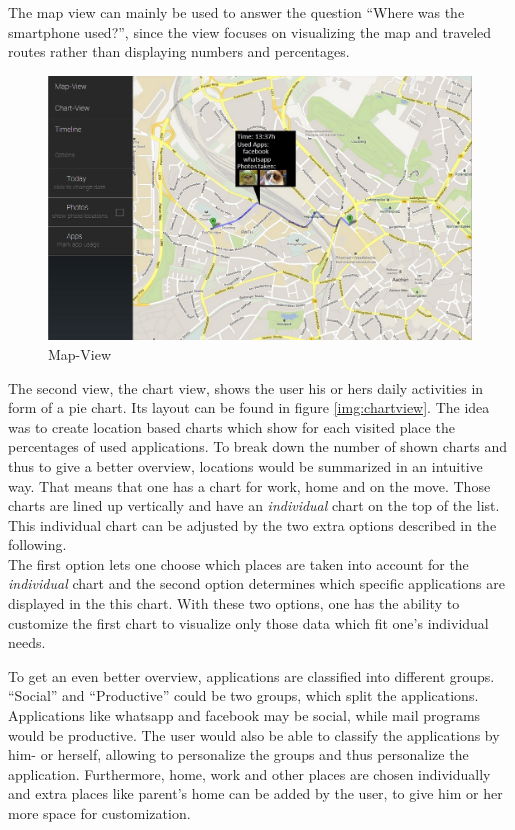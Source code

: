 The map view can mainly be used to answer the question ``Where was the smartphone used?'', since the view focuses on visualizing the map and traveled routes rather than displaying numbers and percentages.
\begin{figure}[h]
	\caption{Map-View}
	\label{img:mapview}
	\includegraphics[width=\textwidth]{images/Design/1b_onClickPageView.jpg}
\end{figure}

The  second view, the chart view, shows the user his or hers daily activities in form of a pie chart. Its layout can be found in figure \ref{img:chartview}. The idea was to create location based charts which show for each visited place the percentages of used applications. To break down the number of shown charts and thus to give a better overview, locations would be summarized in an intuitive way. That means that one has a chart for work, home and on the move. Those charts are lined up vertically and have an \emph{individual} chart on the top of the list. This individual chart can be adjusted by the two extra options described in the following.\\
The  first option lets one choose which places are taken into account for the \emph{individual} chart and the second option determines which specific applications are displayed in the this chart. With these two options, one has the ability to customize the first chart to visualize only those data which fit one's individual needs.

To  get an even better overview, applications are classified into different groups. ``Social'' and ``Productive'' could be two groups, which split the applications. Applications like whatsapp and facebook may be social, while mail programs would be productive. The user would also be able to classify the applications by him- or herself, allowing to personalize the groups and thus personalize the application. Furthermore, home, work and other places are chosen individually and extra places like parent's home can be added by the user, to give him or her more space for customization.


